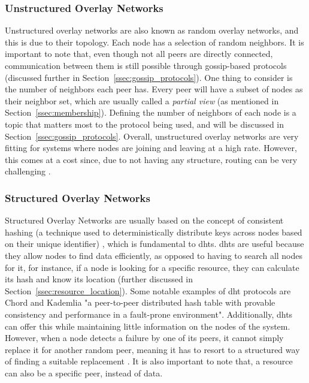 \subsubsection{Unstructured Overlay Networks}
\label{sssec:unstructured_overlay_networks}
\par Unstructured overlay networks are also known as random overlay networks, and this is due to their topology. Each node has a selection of random neighbors. It is important to note that, even though not all peers are directly connected, communication between them is still possible through gossip-based protocols (discussed further in Section~\ref{ssec:gossip_protocols}). One thing to consider is the number of neighbors each peer has. Every peer will have a subset of nodes as their neighbor set, which are usually called a \textit{partial view} (as mentioned in Section~\ref{ssec:membership}). Defining the number of neighbors of each node is a topic that matters most to the protocol being used, and will be discussed in Section~\ref{ssec:gossip_protocols}. Overall, unstructured overlay networks are very fitting for systems where nodes are joining and leaving at a high rate. However, this comes at a cost since, due to not having any structure, routing can be very challenging \cite{EngKeongLua2005}.
%
%
%
\subsubsection{Structured Overlay Networks}
\label{sssec:structured_overlay_networks}
\par Structured Overlay Networks are usually based on the concept of consistent hashing (a technique used to deterministically distribute keys across nodes based on their unique identifier)%
, which is fundamental to \glspl{dht}. \glspl{dht} are useful because they allow nodes to find data efficiently, as opposed to having to search all nodes for it, for instance, if a node is looking for a specific resource, they can calculate its hash and know its location (further discussed in Section~\ref{ssec:resource_location}). Some notable examples of \gls{dht} protocols are Chord \cite{Chord2003} and Kademlia \cite{Kademlia2002} "a peer-to-peer distributed hash table with provable consistency and performance in a fault-prone environment". Additionally, \glspl{dht} can offer this while maintaining little information on the nodes of the system. However, when a node detects a failure by one of its peers, it cannot simply replace it for another random peer, meaning it has to resort to a structured way of finding a suitable replacement \cite{Leitao2010}. It is also important to note that, a resource can also be a specific peer, instead of data.
